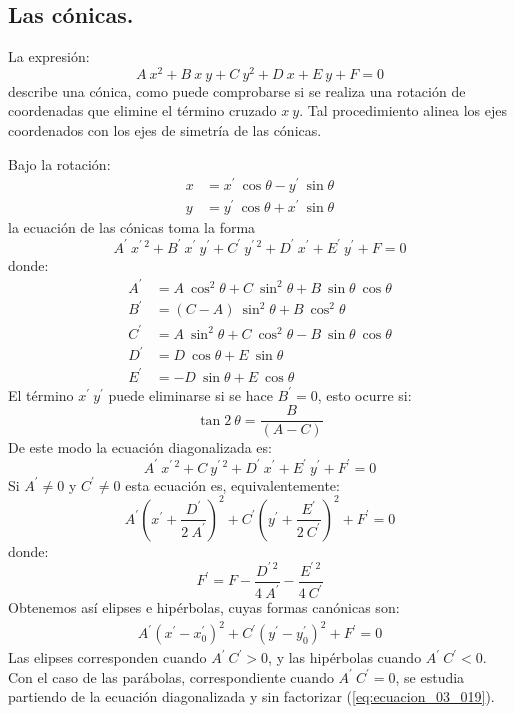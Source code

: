 \subsection{Las cónicas.}
La expresión:
\[ A \: x^{2} + B \: x \: y + C \: y^{2} + D \: x + E \: y + F = 0 \]
describe una cónica, como puede comprobarse si se realiza una rotación de coordenadas que elimine el término cruzado $x \: y$. Tal procedimiento alinea los ejes coordenados con los ejes de simetría de las cónicas.
\par
Bajo la rotación:
\begin{align*}
x &= x^{\prime} \: \cos \theta - y^{\prime} \: \sin \theta \\
y &= y^{\prime} \: \cos \theta + x^{\prime} \: \sin \theta
\end{align*}
la ecuación de las cónicas toma la forma
\[ A^{\prime} \: x^{\prime \: 2} + B^{\prime} \: x^{\prime} \:  y^{\prime} + C^{\prime} \: y^{\prime \: 2} + D^{\prime} \: x^{\prime} + E^{\prime} \: y^{\prime} + F = 0 \]
donde:
\begin{align*}
A^{\prime} &= A \: \cos^{2} \theta + C \: \sin^{2} \theta + B \: \sin \theta  \: \cos \theta \\
B^{\prime} &= (C - A) \: \sin^{2} \theta + B \: \cos^{2} \theta \\
C^{\prime} &= A \: \sin^{2} \theta + C \: \cos^{2} \theta - B \: \sin \theta \: \cos \theta \\
D^{\prime} &= D \: \cos \theta + E \: \sin \theta \\
E^{\prime} &= -D \: \sin \theta + E \: \cos \theta
\end{align*}
El término $x^{\prime} \: y^{\prime}$ puede eliminarse si se hace $B^{\prime} = 0$, esto ocurre si:
\[ \tan 2 \ \theta = \dfrac{B}{(A - C)} \]
De este modo la ecuación diagonalizada es:
\begin{equation}
A^{\prime} \: x^{\prime \: 2} + C \: y^{\prime \: 2} + D^{\prime} \: x^{\prime} + E^{\prime} \: y^{\prime} + F^{\prime} = 0
\label{eq:ecuacion_03_019}
\end{equation}
Si $A^{\prime} \neq 0$ y $C^{\prime} \neq 0$ esta ecuación es, equivalentemente:
\[ A^{\prime} \left( x^{\prime} + \dfrac{D^{\prime}}{2 \: A^{\prime}} \right)^{2} + C^{\prime} \left( y^{\prime} + \dfrac{E^{\prime}}{2 \: C^{\prime}} \right)^{2} + F^{\prime} = 0 \]
donde:
\[ F^{\prime} = F - \dfrac{D^{\prime \: 2}}{4 \: A^{\prime}} - \dfrac{E^{\prime \: 2}}{4 \: C^{\prime}} \]
Obtenemos así elipses e hipérbolas, cuyas formas canónicas son:
\begin{align*}
A^{\prime} \left( x^{\prime} - x_{0}^{\prime} \right)^{2} + C^{\prime} \left( y^{\prime} - y_{0}^{\prime} \right)^{2} + F^{\prime} = 0
\end{align*}
Las elipses corresponden cuando $A^{\prime} \: C^{\prime} > 0$, y las hipérbolas cuando $A^{\prime} \: C^{\prime} < 0$. Con el caso de las parábolas, correspondiente cuando $A^{\prime} \: C^{\prime} = 0$, se estudia partiendo de la ecuación diagonalizada y sin factorizar (\ref{eq:ecuacion_03_019}).

